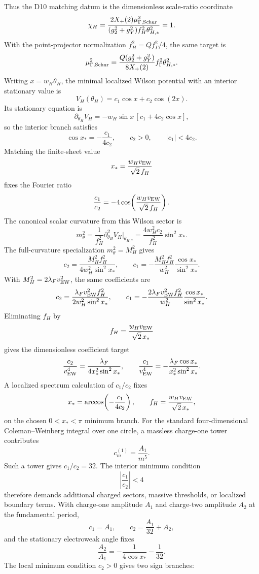 \documentclass[11pt]{article}
\theoremstyle{definition}
\theoremstyle{remark}
\newcommand{\Xp}{X_+}
\begin{document}
Thus the D10 matching datum is the dimensionless scale-ratio coordinate
\[
  \chi_H
  =
  \frac{2\Xp(2)\mu_{\Gamma,{\rm Schur}}^2}
       {(g_2^2+g_Y^2)f_H^2\theta_{H,*}^2}
  =
  1.
\]
With the point-projector normalization \(f_H^2=Qf_\Gamma^2/4\), the same
target is
\[
  \mu_{\Gamma,{\rm Schur}}^2
  =
  \frac{Q(g_2^2+g_Y^2)}{8\Xp(2)}
  f_\Gamma^2\theta_{H,*}^2 .
\]
Writing \(x=w_H\theta_H\), the minimal localized Wilson potential with an
interior stationary value is
\[
  V_H(\theta_H)=c_1\cos x+c_2\cos(2x).
\]
Its stationary equation is
\[
  \partial_{\theta_H}V_H
  =
  -w_H\sin x\,[c_1+4c_2\cos x],
\]
so the interior branch satisfies
\[
  \cos x_*=-\frac{c_1}{4c_2},
  \qquad
  c_2>0,\qquad |c_1|<4c_2.
\]
Matching the finite-sheet value
\[
  x_*=\frac{w_Hv_{\rm EW}}{\sqrt2\,f_H}
\]
fixes the Fourier ratio
\[
  \frac{c_1}{c_2}=-4\cos\!\left(
  \frac{w_Hv_{\rm EW}}{\sqrt2\,f_H}
  \right).
\]
The canonical scalar curvature from this Wilson sector is
\[
  m_\theta^2
  =
  \frac{1}{f_H^2}\partial_{\theta_H}^2V_H\big|_{\theta_{H,*}}
  =
  \frac{4w_H^2c_2}{f_H^2}\sin^2x_*.
\]
The full-curvature specialization \(m_\theta^2=M_H^2\) gives
\[
  c_2=
  \frac{M_H^2f_H^2}{4w_H^2\sin^2x_*},
  \qquad
  c_1=
  -\frac{M_H^2f_H^2}{w_H^2}
  \frac{\cos x_*}{\sin^2x_*}.
\]
With \(M_H^2=2\lambda_Fv_{\rm EW}^2\), the same coefficients are
\[
  c_2=
  \frac{\lambda_Fv_{\rm EW}^2f_H^2}{2w_H^2\sin^2x_*},
  \qquad
  c_1=
  -\frac{2\lambda_Fv_{\rm EW}^2f_H^2}{w_H^2}
  \frac{\cos x_*}{\sin^2x_*}.
\]
Eliminating \(f_H\) by
\[
  f_H=\frac{w_Hv_{\rm EW}}{\sqrt2\,x_*}
\]
gives the dimensionless coefficient target
\[
  \frac{c_2}{v_{\rm EW}^4}
  =
  \frac{\lambda_F}{4x_*^2\sin^2x_*},
  \qquad
  \frac{c_1}{v_{\rm EW}^4}
  =
  -\frac{\lambda_F\cos x_*}{x_*^2\sin^2x_*}.
\]
A localized spectrum calculation of \(c_1/c_2\) fixes
\[
  x_*=\arccos\!\left(-\frac{c_1}{4c_2}\right),
  \qquad
  f_H=\frac{w_Hv_{\rm EW}}{\sqrt2\,x_*},
\]
on the chosen \(0<x_*<\pi\) minimum branch.
For the standard four-dimensional Coleman--Weinberg integral over one
circle, a massless charge-one tower contributes
\[
  c_m^{(1)}=\frac{A_1}{m^5}.
\]
Such a tower gives \(c_1/c_2=32\).  The interior minimum condition
\[
  \left|\frac{c_1}{c_2}\right|<4
\]
therefore demands additional charged sectors, massive thresholds, or
localized boundary terms.  With charge-one amplitude \(A_1\) and charge-two
amplitude \(A_2\) at the fundamental period,
\[
  c_1=A_1,\qquad c_2=\frac{A_1}{32}+A_2,
\]
and the stationary electroweak angle fixes
\[
  \frac{A_2}{A_1}
  =
  -\frac{1}{4\cos x_*}-\frac{1}{32}.
\]
The local minimum condition \(c_2>0\) gives two sign branches:
\end{document}
